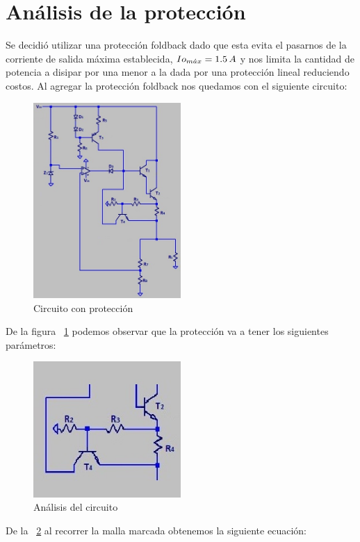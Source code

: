 \documentclass[e2_tp1_main.tex]{subfiles}
\begin{document}
\section{Análisis de la protección}
Se decidió utilizar una protección foldback dado que esta evita el pasarnos de la corriente de salida máxima establecida, $Io_{m\acute{a}x}=1.5\thinspace{A}$ y nos limita la cantidad de potencia a disipar por una menor a la dada por una protección lineal reduciendo costos.
Al agregar la protección foldback nos quedamos con el siguiente circuito:
\begin{figure}[H]
  \centering
   \includegraphics[width=0.5\textwidth]{CircuitoProtec.jpg}
   \caption{Circuito con protección}
   \label{fig:CircuitoProtec}
\end{figure}
De la figura ~\ref{fig:CircuitoProtec} podemos observar que la protección va a tener los siguientes parámetros:
\begin{figure}[H]
  \centering
   \includegraphics[width=0.5\textwidth]{AnalProtec.jpg}
   \caption{Análisis del circuito}
   \label{fig:AnalProtec}
\end{figure}
De la ~\ref{fig:AnalProtec} al recorrer la malla marcada obtenemos la siguiente ecuación:
\end{document}
